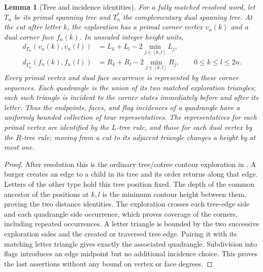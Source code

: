\documentclass[11pt]{article}
\numberwithin{equation}{section}
\newtheorem{lemma}[theorem]{Lemma}
\theoremstyle{definition}
\theoremstyle{remark}
\newcommand{\1}{\mathbf 1}
\begin{document}
\begin{lemma}[Tree and incidence identities]\label{enc:incidence}
For a fully matched resolved word, let $T_n$ be its primal spanning tree
and $T_n^*$ the complementary dual spanning tree.  At the cut after
letter $k$, the exploration has a primal corner vertex $v_n(k)$ and a
dual corner face $f_n(k)$.  In unscaled integer height units,
\begin{align*}
 d_{T_n}(v_n(k),v_n(l))
 &=L_k+L_l-2\min_{j\in[k,l]}L_j,\\
 d_{T_n^*}(f_n(k),f_n(l))
 &=R_k+R_l-2\min_{j\in[k,l]}R_j,
 \qquad 0\le k\le l\le2n.
\end{align*}
Every primal vertex and dual face occurrence is represented by these
corner sequences.  Each quadrangle is the union of its two matched
exploration triangles; each such triangle is incident to the corner
states immediately before and after its letter.  Thus the endpoints,
faces, and flag incidences of a quadrangle have a uniformly bounded
collection of tour representatives.  The representatives for each
primal vertex are identified by the $L$-tree rule, and those for each
dual vertex by the $R$-tree rule; moving from a cut to its adjacent
triangle changes a height by at most one.
\end{lemma}

\begin{proof}
After resolution this is the ordinary tree/cotree contour exploration
in \cite[Section 4.1, Figures 6--7]{SheffieldInventory}.  A burger
creates an edge to a child in its tree and its order returns along
that edge.  Letters of the other type hold this tree position fixed.
The depth of the common ancestor of the positions at $k,l$ is the
minimum contour height between them, proving the two distance
identities.  The exploration crosses each tree-edge side and each
quadrangle side occurrence, which proves coverage of the corners,
including repeated occurrences.  A letter triangle is bounded by the
two successive exploration sides and the created or traversed tree
edge.  Pairing it with its matching letter triangle gives exactly the
associated quadrangle.  Subdivision into flags introduces an edge
midpoint but no additional incidence choice.  This proves the last
assertions without any bound on vertex or face degrees.
\end{proof}
\end{document}
